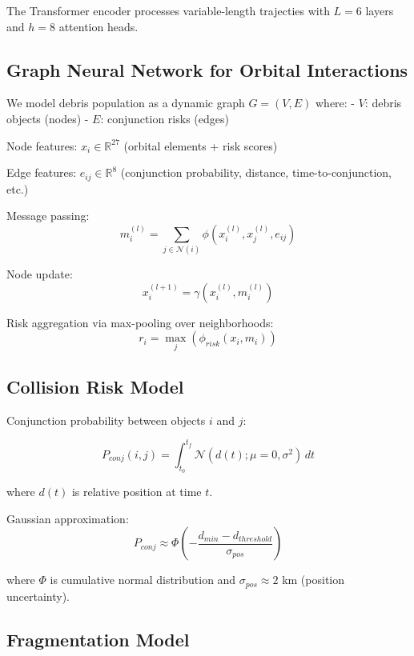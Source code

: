\documentclass[10pt,conference]{IEEEtran}
\begin{document}
The Transformer encoder processes variable-length trajecties with $L = 6$ layers and $h = 8$ attention heads.

\subsection{Graph Neural Network for Orbital Interactions}

We model debris population as a dynamic graph $G = (V, E)$ where:
- $V$: debris objects (nodes)
- $E$: conjunction risks (edges)

Node features: $x_i \in \mathbb{R}^{27}$ (orbital elements + risk scores)

Edge features: $e_{ij} \in \mathbb{R}^{8}$ (conjunction probability, distance, time-to-conjunction, etc.)

Message passing:
\begin{equation}
m_i^{(l)} = \sum_{j \in \mathcal{N}(i)} \phi(x_i^{(l)}, x_j^{(l)}, e_{ij})
\end{equation}

Node update:
\begin{equation}
x_i^{(l+1)} = \gamma(x_i^{(l)}, m_i^{(l)})
\end{equation}

Risk aggregation via max-pooling over neighborhoods:
\begin{equation}
r_i = \max_j(\phi_{risk}(x_i, m_i))
\end{equation}

\subsection{Collision Risk Model}

Conjunction probability between objects $i$ and $j$:

\begin{equation}
P_{conj}(i,j) = \int_{t_0}^{t_f} \mathcal{N}(d(t); \mu=0, \sigma^2) \, dt
\end{equation}

where $d(t)$ is relative position at time $t$.

Gaussian approximation:
\begin{equation}
P_{conj} \approx \Phi\left(-\frac{d_{min} - d_{threshold}}{\sigma_{pos}}\right)
\end{equation}

where $\Phi$ is cumulative normal distribution and $\sigma_{pos} \approx 2$ km (position uncertainty).

\subsection{Fragmentation Model}
\end{document}
